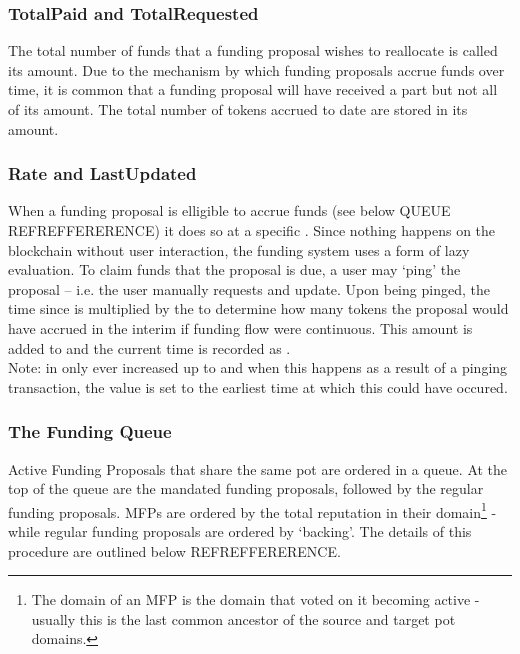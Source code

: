 \subsubsection*{TotalPaid and TotalRequested}
The total number of funds that a funding proposal wishes to reallocate is called its  amount. Due to the mechanism by which funding proposals accrue funds over time, it is common that a funding proposal will have received a part but not all of its  amount. The total number of tokens accrued to date are stored in its  amount. 

\subsubsection*{Rate and LastUpdated}
When a funding proposal is elligible to accrue funds (see below QUEUE REFREFFERERENCE) it does so at a specific . Since nothing happens on the blockchain without user interaction, the funding system uses a form of lazy evaluation. To claim funds that the proposal is due, a user may `ping' the proposal -- i.e. the user manually requests and update. Upon being pinged, the time since  is multiplied by the  to determine how many tokens the proposal would have accrued in the interim if funding flow were continuous. This amount is added to  and the current time is recorded as .\\
Note:  in only ever increased up to  and when this happens as a result of a pinging transaction, the  value is set to the earliest time at which this could have occured.

\subsubsection{The Funding Queue}
Active Funding Proposals that share the same  pot are ordered in a queue. At the top of the queue are the mandated funding proposals, followed by the regular funding proposals. MFPs are ordered by the total reputation in their domain\footnote{The domain of an MFP is the domain that voted on it becoming active - usually this is the last common ancestor of the source and target pot domains.} - while regular funding proposals are ordered by `backing'.  The details of this procedure are outlined below REFREFFERERENCE.\\



